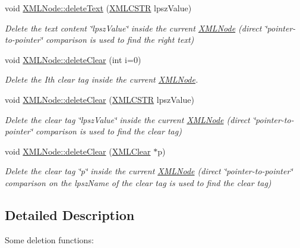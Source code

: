 \begin{DoxyCompactItemize}
void \hyperlink{group__xmlDelete_ga21ee499630d71ab6026753a85f02f582}{X\-M\-L\-Node\-::delete\-Text} (\hyperlink{xmlParser_8h_acdb0d6fd8dd596384b438d86cfb2b182}{X\-M\-L\-C\-S\-T\-R} lpsz\-Value)
\begin{DoxyCompactList}\small\item\em Delete the text content \char`\"{}lpsz\-Value\char`\"{} inside the current \hyperlink{structXMLNode}{X\-M\-L\-Node} (direct \char`\"{}pointer-\/to-\/pointer\char`\"{} comparison is used to find the right text) \end{DoxyCompactList}\item 
void \hyperlink{group__xmlDelete_ga44b72c82310eb4319dba46eb9cc9f6e9}{X\-M\-L\-Node\-::delete\-Clear} (int i=0)
\begin{DoxyCompactList}\small\item\em Delete the Ith clear tag inside the current \hyperlink{structXMLNode}{X\-M\-L\-Node}. \end{DoxyCompactList}\item 
void \hyperlink{group__xmlDelete_ga8fff4baa9a8000f8662ee302438fff64}{X\-M\-L\-Node\-::delete\-Clear} (\hyperlink{xmlParser_8h_acdb0d6fd8dd596384b438d86cfb2b182}{X\-M\-L\-C\-S\-T\-R} lpsz\-Value)
\begin{DoxyCompactList}\small\item\em Delete the clear tag \char`\"{}lpsz\-Value\char`\"{} inside the current \hyperlink{structXMLNode}{X\-M\-L\-Node} (direct \char`\"{}pointer-\/to-\/pointer\char`\"{} comparison is used to find the clear tag) \end{DoxyCompactList}\item 
void \hyperlink{group__xmlDelete_gae92182823d3d5b40893103ad222ec4a8}{X\-M\-L\-Node\-::delete\-Clear} (\hyperlink{structXMLClear}{X\-M\-L\-Clear} $\ast$p)
\begin{DoxyCompactList}\small\item\em Delete the clear tag \char`\"{}p\char`\"{} inside the current \hyperlink{structXMLNode}{X\-M\-L\-Node} (direct \char`\"{}pointer-\/to-\/pointer\char`\"{} comparison on the lpsz\-Name of the clear tag is used to find the clear tag) \end{DoxyCompactList}\end{DoxyCompactItemize}


\subsection{Detailed Description}
Some deletion functions\-: 

